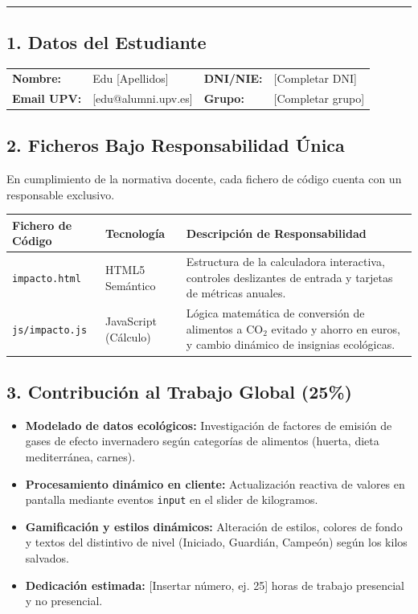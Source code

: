 \documentclass[11pt,a4paper]{article}
\begin{document}
\vspace{0.3cm}
\hrule
\vspace{0.4cm}

\subsection*{1. Datos del Estudiante}
\begin{tabularx}{\textwidth}{l X l X}
    \textbf{Nombre:} & Edu [Apellidos] & \textbf{DNI/NIE:} & [Completar DNI] \\
    \textbf{Email UPV:} & [edu@alumni.upv.es] & \textbf{Grupo:} & [Completar grupo] \\
\end{tabularx}

\vspace{0.4cm}
\subsection*{2. Ficheros Bajo Responsabilidad Única}
En cumplimiento de la normativa docente, cada fichero de código cuenta con un responsable exclusivo.
\begin{table}[h!]
\centering
\small
\begin{tabularx}{\textwidth}{p{4cm} p{3.5cm} X}
\toprule
\textbf{Fichero de Código} & \textbf{Tecnología} & \textbf{Descripción de Responsabilidad} \\
\midrule
\texttt{impacto.html} & HTML5 Semántico & Estructura de la calculadora interactiva, controles deslizantes de entrada y tarjetas de métricas anuales. \\
\addlinespace
\texttt{js/impacto.js} & JavaScript (Cálculo) & Lógica matemática de conversión de alimentos a CO$_2$ evitado y ahorro en euros, y cambio dinámico de insignias ecológicas. \\
\bottomrule
\end{tabularx}
\end{table}

\subsection*{3. Contribución al Trabajo Global (25\%)}
\begin{itemize}
    \item \textbf{Modelado de datos ecológicos:} Investigación de factores de emisión de gases de efecto invernadero según categorías de alimentos (huerta, dieta mediterránea, carnes).
    \item \textbf{Procesamiento dinámico en cliente:} Actualización reactiva de valores en pantalla mediante eventos \texttt{input} en el slider de kilogramos.
    \item \textbf{Gamificación y estilos dinámicos:} Alteración de estilos, colores de fondo y textos del distintivo de nivel (Iniciado, Guardián, Campeón) según los kilos salvados.
    \item \textbf{Dedicación estimada:} [Insertar número, ej. 25] horas de trabajo presencial y no presencial.
\end{itemize}
\end{document}

